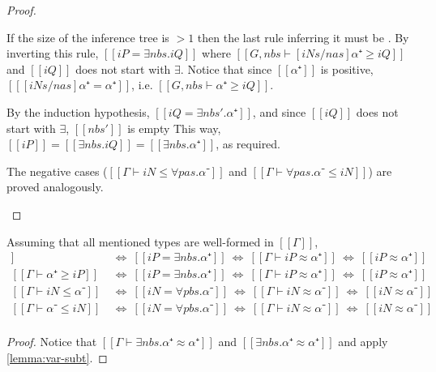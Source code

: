 \begin{corollary}
\begin{proof}
\begin{caseof}
    If the size of the inference tree is $>1$ then the last rule inferring
    it must be . By inverting this rule,
    $[[iP = ∃nbs.iQ]]$ where $[[G, nbs ⊢ [iNs/nas]α⁺ ≥ iQ]]$ and $[[iQ]]$ 
    does not start with $\exists$.
    Notice that since $[[α⁺]]$ is positive, $[[ [iNs/nas]α⁺ = α⁺]]$, 
    i.e. $[[G, nbs ⊢ α⁺ ≥ iQ]]$.

    By the induction hypothesis, $[[iQ = ∃nbs'.α⁺]]$,
    and since $[[iQ]]$ does not start with $\exists$, $[[nbs']]$ is empty
    This way, $[[iP]] = [[∃nbs.iQ]] = [[∃nbs.α⁺]]$, as required.

  \item The negative cases ($[[Γ ⊢ iN ≤ ∀pas.α⁻]]$ and $[[Γ ⊢ ∀pas.α⁻ ≤ iN ]]$)
    are proved analogously.
  \end{caseof}
\end{proof}

\begin{corollary}
  \label{corollary:vars-no-proper-subtypes}
  Assuming that all mentioned types are well-formed in $[[Γ]]$,
  \begin{align*}
    [[Γ ⊢ iP ≥ α⁺]] ~ &\iff ~ [[iP = ∃nbs.α⁺]]  ~ \iff ~ [[Γ ⊢ iP ≈ α⁺]] ~ \iff ~ [[iP ≈ α⁺]]\\
    [[Γ ⊢ α⁺≥ iP]]  ~ &\iff ~ [[iP = ∃nbs.α⁺]]  ~ \iff ~ [[Γ ⊢ iP ≈ α⁺]] ~ \iff ~ [[iP ≈ α⁺]]\\
    [[Γ ⊢ iN ≤ α⁻]] ~ &\iff ~ [[iN = ∀pbs.α⁻]]  ~ \iff ~ [[Γ ⊢ iN ≈ α⁻]] ~ \iff ~ [[iN ≈ α⁻]]\\
    [[Γ ⊢ α⁻ ≤ iN]] ~ &\iff ~ [[iN = ∀pbs.α⁻]]  ~ \iff ~ [[Γ ⊢ iN ≈ α⁻]] ~ \iff ~ [[iN ≈ α⁻]]\\
  \end{align*}
\end{corollary}
\begin{proof}
  Notice that $[[Γ ⊢ ∃nbs.α⁺ ≈ α⁺]]$ and $[[∃nbs.α⁺ ≈ α⁺]]$ and apply
  \cref{lemma:var-subt}.
\end{proof}


\end{corollary}
